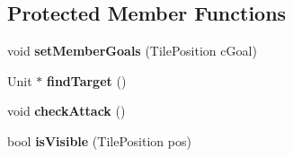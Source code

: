 \subsection*{Protected Member Functions}
\begin{DoxyCompactItemize}
\item 
\hypertarget{class_squad_a6aa45393c71f47d593c77dd49e62424a}{void {\bfseries set\-Member\-Goals} (Tile\-Position c\-Goal)}\label{class_squad_a6aa45393c71f47d593c77dd49e62424a}

\item 
\hypertarget{class_squad_a2a0a2877febb058e12d5124b5077583a}{Unit $\ast$ {\bfseries find\-Target} ()}\label{class_squad_a2a0a2877febb058e12d5124b5077583a}

\item 
\hypertarget{class_squad_abf6dc86d8a7c2a39a8d29b090bea9f3c}{void {\bfseries check\-Attack} ()}\label{class_squad_abf6dc86d8a7c2a39a8d29b090bea9f3c}

\item 
\hypertarget{class_squad_a4ec28ce427f24a65b0a349a87dc7ecae}{bool {\bfseries is\-Visible} (Tile\-Position pos)}\label{class_squad_a4ec28ce427f24a65b0a349a87dc7ecae}

\end{DoxyCompactItemize}
